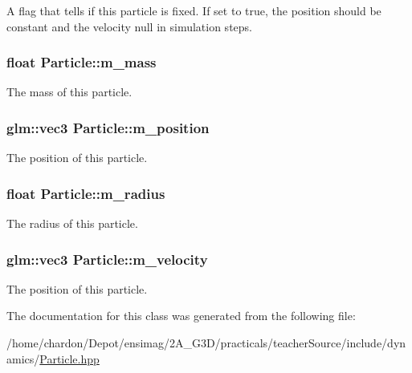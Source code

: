 A flag that tells if this particle is fixed. If set to true, the position should be constant and the velocity null in simulation steps. \hypertarget{classParticle_ab78b76aeb4d163132a0c27ea4c5beb75}{
\subsubsection[{m\+\_\+mass}]{\setlength{\rightskip}{0pt plus 5cm}float Particle\+::m\+\_\+mass\hspace{0.3cm}{\ttfamily [private]}}}\label{classParticle_ab78b76aeb4d163132a0c27ea4c5beb75}
The mass of this particle. \hypertarget{classParticle_ad6daec7ed061255747fbe26ee88429c6}{
\subsubsection[{m\+\_\+position}]{\setlength{\rightskip}{0pt plus 5cm}glm\+::vec3 Particle\+::m\+\_\+position\hspace{0.3cm}{\ttfamily [private]}}}\label{classParticle_ad6daec7ed061255747fbe26ee88429c6}
The position of this particle. \hypertarget{classParticle_af6aee0d324572f74a1bdc28937d04a0b}{
\subsubsection[{m\+\_\+radius}]{\setlength{\rightskip}{0pt plus 5cm}float Particle\+::m\+\_\+radius\hspace{0.3cm}{\ttfamily [private]}}}\label{classParticle_af6aee0d324572f74a1bdc28937d04a0b}
The radius of this particle. \hypertarget{classParticle_ae8433e1a1968203478096f319a04e111}{
\subsubsection[{m\+\_\+velocity}]{\setlength{\rightskip}{0pt plus 5cm}glm\+::vec3 Particle\+::m\+\_\+velocity\hspace{0.3cm}{\ttfamily [private]}}}\label{classParticle_ae8433e1a1968203478096f319a04e111}
The position of this particle. 

The documentation for this class was generated from the following file\+:\begin{DoxyCompactItemize}
\item 
/home/chardon/\+Depot/ensimag/2\+A\+\_\+\+G3\+D/practicals/teacher\+Source/include/dynamics/\hyperlink{Particle_8hpp}{Particle.\+hpp}\end{DoxyCompactItemize}
